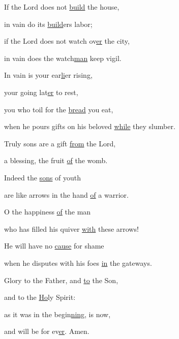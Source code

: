 \noindent If the Lord does not \uline{build} the house, ~\GreStar{}~\nopagebreak

in vain do its \uline{build}ers labor;

\noindent if the Lord does not watch ov\uline{er} the city, ~\GreStar{}~\nopagebreak

in vain does the watch\uline{man} keep vigil.

\noindent In vain is your ear\uline{li}er rising, ~\GreStar{}~\nopagebreak

your going lat\uline{er} to rest,

\noindent you who toil for the \uline{bread} you eat, ~\GreStar{}~\nopagebreak

when he pours gifts on his beloved \uline{while} they slumber.

\noindent Truly sons are a gift \uline{from} the Lord, ~\GreStar{}~\nopagebreak

a blessing, the fruit \uline{of} the womb.

\noindent Indeed the \uline{sons} of youth ~\GreStar{}~\nopagebreak

are like arrows in the hand \uline{of} a warrior.

\noindent O the happiness \uline{of} the man ~\GreStar{}~\nopagebreak

who has filled his quiver \uline{with} these arrows!

\noindent He will have no \uline{cause} for shame ~\GreStar{}~\nopagebreak

when he disputes with his foes \uline{in} the gateways.

\noindent Glory to the Father, and \uline{to} the Son,~\GreStar{}~\nopagebreak

and to the \uline{Ho}ly Spirit:

\noindent as it was in the begin\uline{ning}, is now,~\GreStar{}~\nopagebreak

and will be for ev\uline{er}. Amen.
